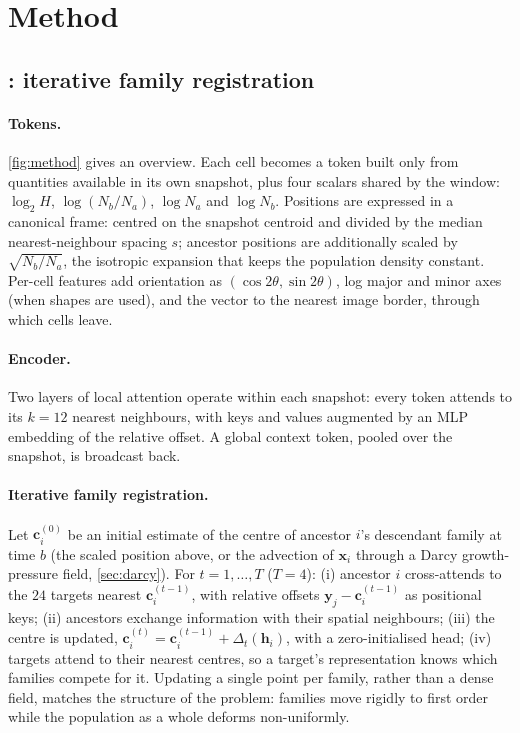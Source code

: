 \section{Method}

\label{sec:method}

\subsection{\ours: iterative family registration}
\label{sec:raft}

\paragraph{Tokens.}
\cref{fig:method} gives an overview. Each cell becomes a token built only from quantities available in its own snapshot, plus four scalars shared by the window: $\log_2 H$, $\log(N_b/N_a)$, $\log N_a$ and $\log N_b$.
Positions are expressed in a canonical frame: centred on the snapshot centroid and divided by the median nearest-neighbour spacing $s$; ancestor positions are additionally scaled by $\sqrt{N_b/N_a}$, the isotropic expansion that keeps the population density constant.
Per-cell features add orientation as $(\cos 2\theta,\sin 2\theta)$, log major and minor axes (when shapes are used), and the vector to the nearest image border, through which cells leave.

\paragraph{Encoder.}
Two layers of local attention operate within each snapshot: every token attends to its $k{=}12$ nearest neighbours, with keys and values augmented by an MLP embedding of the relative offset.
A global context token, pooled over the snapshot, is broadcast back.

\paragraph{Iterative family registration.}
Let $\mathbf{c}_i^{(0)}$ be an initial estimate of the centre of ancestor $i$'s descendant family at time $b$ (the scaled position above, or the advection of $\mathbf{x}_i$ through a Darcy growth-pressure field, \cref{sec:darcy}).
For $t=1,\dots,T$ ($T{=}4$):
(i) ancestor $i$ cross-attends to the $24$ targets nearest $\mathbf{c}_i^{(t-1)}$, with relative offsets $\mathbf{y}_j-\mathbf{c}_i^{(t-1)}$ as positional keys;
(ii) ancestors exchange information with their spatial neighbours;
(iii) the centre is updated, $\mathbf{c}_i^{(t)}=\mathbf{c}_i^{(t-1)}+\Delta_t(\mathbf{h}_i)$, with a zero-initialised head;
(iv) targets attend to their nearest centres, so a target's representation knows which families compete for it.
Updating a single point per family, rather than a dense field, matches the structure of the problem: families move rigidly to first order while the population as a whole deforms non-uniformly.

